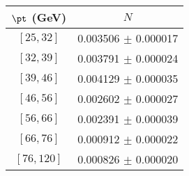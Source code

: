 \begin{tabular}{c||c}
$\pt$ (GeV) & $N$  \\
\hline
$[25, 32]$ & 0.003506 $\pm$ 0.000017\\
$[32, 39]$ & 0.003791 $\pm$ 0.000024\\
$[39, 46]$ & 0.004129 $\pm$ 0.000035\\
$[46, 56]$ & 0.002602 $\pm$ 0.000027\\
$[56, 66]$ & 0.002391 $\pm$ 0.000039\\
$[66, 76]$ & 0.000912 $\pm$ 0.000022\\
$[76, 120]$ & 0.000826 $\pm$ 0.000020\\
\end{tabular}
